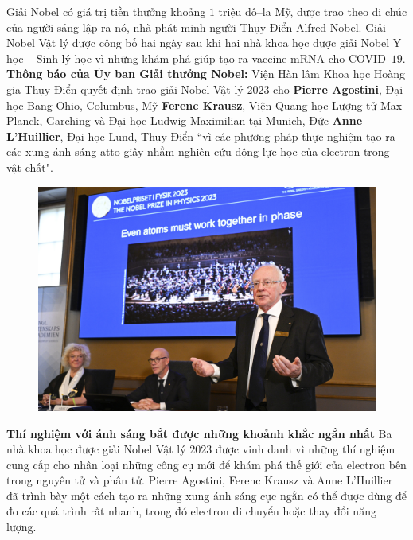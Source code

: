 \begin{multicols}{2}
\begin{figure}[H]
		\vspace*{-15pt}
	\end{figure}
	Giải Nobel có giá trị tiền thưởng khoảng $1$ triệu đô--la Mỹ, được trao theo di chúc của người sáng lập ra nó, nhà phát minh người Thụy Điển Alfred Nobel.
	\vskip 0.1cm
	Giải Nobel Vật lý được công bố hai ngày sau khi hai nhà khoa học được giải Nobel Y học -- Sinh lý học vì những khám phá giúp tạo ra vaccine mRNA cho COVID--$19$.
	\vskip 0.1cm
	\textbf{\color{timhieukhoahoc}Thông báo của Ủy ban Giải thưởng Nobel:}
	\vskip 0.1cm
	Viện Hàn lâm Khoa học Hoàng gia Thụy Điển quyết định trao giải Nobel Vật lý $2023$ cho
	\vskip 0.1cm
	\textbf{\color{timhieukhoahoc}Pierre Agostini}, Đại học Bang Ohio, Columbus, Mỹ
	\vskip 0.1cm
	\textbf{\color{timhieukhoahoc}Ferenc Krausz},  Viện Quang học Lượng tử Max Planck, Garching và Đại học Ludwig Maximilian tại Munich, Đức
	\vskip 0.1cm
	\textbf{\color{timhieukhoahoc}Anne L'Huillier}, Đại học Lund, Thụy Điển
	\vskip 0.1cm
	``vì các phương pháp thực nghiệm tạo ra các xung ánh sáng atto giây nhằm nghiên cứu động lực học của electron trong vật chất".
	\begin{figure}[H]
		\vspace*{-5pt}
		\centering
		\captionsetup{labelformat= empty, justification=centering}
		\includegraphics[width= 1\linewidth]{9}
		\vspace*{-15pt}
	\end{figure}
	\textbf{\color{timhieukhoahoc}Thí nghiệm với ánh sáng bắt được những khoảnh khắc ngắn nhất}
	\vskip 0.1cm
	Ba nhà khoa học được giải Nobel Vật lý $2023$ được vinh danh vì những thí nghiệm cung cấp cho nhân loại những công cụ mới để khám phá thế giới của electron bên trong nguyên tử và phân tử. Pierre Agostini, Ferenc Krausz và Anne L'Huillier đã trình bày một cách tạo ra những xung ánh sáng cực ngắn có thể được dùng để đo các quá trình rất nhanh, trong đó electron di chuyển hoặc thay đổi năng lượng.

\end{multicols}
